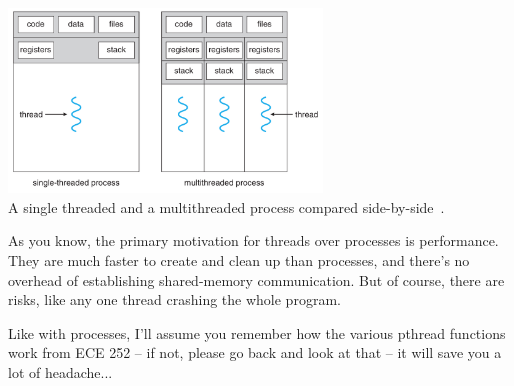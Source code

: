 \begin{center}
	\includegraphics[width=0.625\textwidth]{images/mthread2.png}\\
	A single threaded and a multithreaded process compared side-by-side~\cite{osc}.
\end{center}


As you know, the primary motivation for threads over processes is performance. They are much faster to create and clean up than processes, and there's no overhead of establishing shared-memory communication. But of course, there are risks, like any one thread crashing the whole program. 

Like with processes, I'll assume you remember how the various pthread functions work from ECE 252 -- if not, please go back and look at that -- it will save you a lot of headache...



